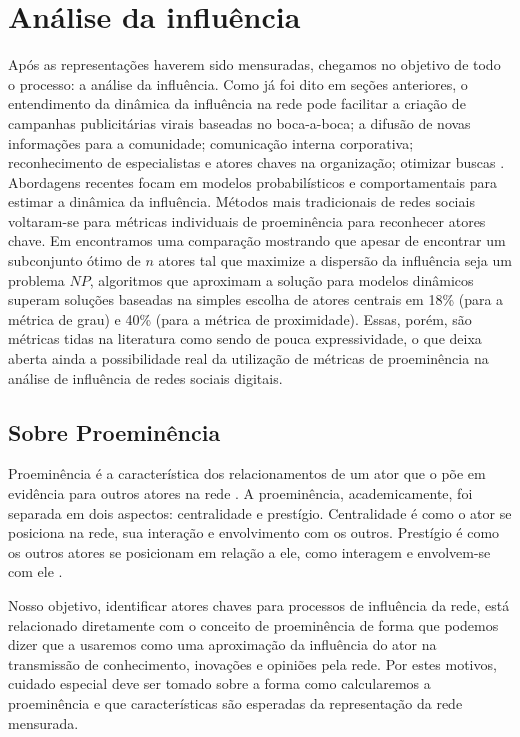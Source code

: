\chapter{Análise da influência}
\label{ch:mineracao}

Após as representações haverem sido mensuradas, chegamos no objetivo de todo o
processo: a análise da influência. Como já foi dito em seções anteriores, o
entendimento da dinâmica da influência na rede pode facilitar a criação de
campanhas publicitárias virais baseadas no boca-a-boca; a difusão de novas
informações para a comunidade; comunicação interna corporativa; reconhecimento de
especialistas e atores chaves na organização; otimizar buscas
\citep{Kirchhoff2009}. Abordagens recentes focam em modelos probabilísticos e
comportamentais para estimar a dinâmica da influência. Métodos mais tradicionais
de redes sociais voltaram-se para métricas individuais de proeminência para
reconhecer atores chave. Em \citet{Kempe2003} encontramos uma comparação
mostrando que apesar de encontrar um subconjunto ótimo de $n$ atores tal que
maximize a dispersão da influência seja um problema $NP$, algoritmos que
aproximam a solução para modelos dinâmicos superam soluções baseadas na simples
escolha de atores centrais em 18\% (para a métrica de grau) e 40\% (para a
métrica de proximidade). Essas, porém, são métricas tidas na literatura como
sendo de pouca expressividade, o que deixa aberta ainda a possibilidade real da
utilização de métricas de proeminência na análise de influência de redes sociais
digitais.

\section{Sobre Proeminência}
\label{sec:sobre-proem}
Proeminência é a característica dos relacionamentos de um ator que o põe em
evidência para outros atores na rede \citep{Wasserman}. A proeminência,
academicamente, foi separada em dois aspectos: centralidade e prestígio.
Centralidade é como o ator se posiciona na rede, sua interação e envolvimento com
os outros. Prestígio é como os outros atores se posicionam em relação a ele, como
interagem e envolvem-se com ele \citep{Knoke1983}.

Nosso objetivo, identificar atores chaves para processos de influência da rede,
está relacionado diretamente com o conceito de proeminência de forma que podemos
dizer que a usaremos como uma aproximação da influência do ator na transmissão de
conhecimento, inovações e opiniões pela rede. Por estes motivos, cuidado especial
deve ser tomado sobre a forma como calcularemos a proeminência e que
características são esperadas da representação da rede mensurada.

